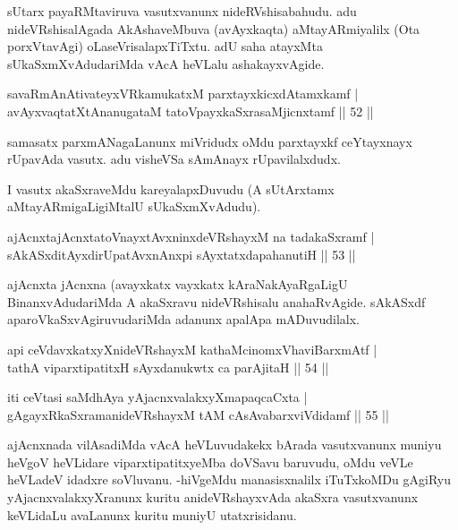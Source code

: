 \begin{artha}
sUtarx payaRMtaviruva vasutxvanunx nideRVshisabahudu. adu nideVRshisalAgada AkAshaveMbuva (avAyxkaqta) aMtayARmiyalilx (Ota porxVtavAgi) oLaseVrisalapxTiTxtu. adU saha atayxMta sUkaSxmXvAdudariMda vAcA heVLalu ashakayxvAgide.
\end{artha}


\begin{shl}
savaRmAnAtivateyxVRkamukatxM parxtayxkicxdAtamxkamf |\\
avAyxvaqtatXtAnanugataM tatoV\s payxkaSxrasaMjicnxtamf \hfill || 52 ||
\end{shl}

\begin{artha}
samasatx parxmANagaLanunx miVridudx oMdu parxtayxkf ceYtayxnayx rUpavAda vasutx. adu visheVSa sAmAnayx rUpavilalxdudx.

I vasutx akaSxraveMdu kareyalapxDuvudu (A sUtArxtamx aMtayARmigaLigiMtalU sUkaSxmXvAdudu).
\end{artha}


\begin{shl}
ajAcnxtajAcnxtatoV\s nayxtAvxninxdeVRshayxM na tadakaSxramf |\\
sAkASxditAyxdirUpatAvxnAnxpi sAyxtatxdapahanutiH \hfill || 53 ||
\end{shl}

\begin{artha}
ajAcnxta jAcnxna (avayxkatx vayxkatx kAraNakAyaRgaLigU BinanxvAdudariMda A akaSxravu nideVRshisalu anahaRvAgide. sAkASxdf aparoVkaSxvAgiruvudariMda adanunx apalApa mADuvudilalx.
\end{artha}%

\begin{shl}
api ceVdavxkatxyXnideVRshayxM kathaMcinomxVhaviBarxmAtf |\\
tathA viparxtipatitxH sAyxdanukwtx ca parAjitaH \hfill || 54 ||
\end{shl}

\begin{shl}
iti ceVtasi saMdhAya yAjacnxvalakxyXmapaqcaCxta |\\
gAgayxRkaSxramanideVRshayxM tAM cAsAvabarxviVdidamf \hfill || 55 ||
\end{shl}

\begin{artha}
ajAcnxnada vilAsadiMda vAcA heVLuvudakekx bArada vasutxvanunx muniyu heVgoV heVLidare viparxtipatitxyeMba doVSavu baruvudu, oMdu veVLe heVLadeV idadxre soVluvanu. -hiVgeMdu manasisxnalilx iTuTxkoMDu gAgiRyu yAjacnxvalakxyXranunx kuritu anideVRshayxvAda akaSxra vasutxvanunx keVLidaLu avaLanunx kuritu muniyU utatxrisidanu.
\end{artha}

